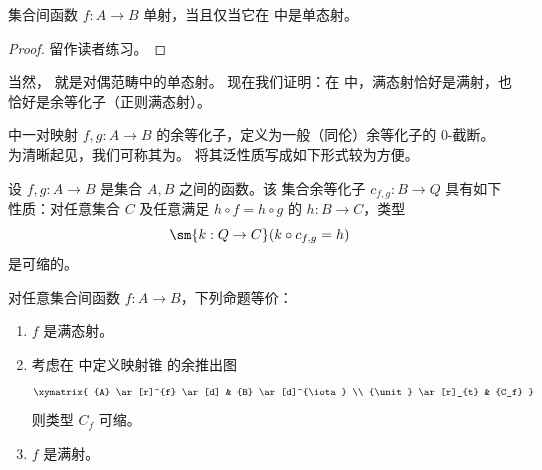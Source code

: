\begin{lem}\label{thm:inj-mono}
  集合间函数 $f:A\to B$ 单射，当且仅当它在 \uset 中是单态射。
\end{lem}
\begin{proof}
  留作读者练习。
\end{proof}

当然，
%
%
就是对偶范畴中的单态射。
现在我们证明：在 \uset 中，满态射恰好是满射，也恰好是余等化子（正则满态射）。

\uset 中一对映射 $f,g:A\to B$ 的余等化子，定义为一般（同伦）余等化子的 0-截断。
为清晰起见，我们可称其为。
%
%
将其泛性质写成如下形式较为方便。

\begin{lem}
%
设 $f,g:A\to B$ 是集合 $A,B$ 之间的函数。该
集合余等化子 $c_{f,g}:B\to Q$ 具有如下性质：对任意集合 $C$ 及任意满足 $h\circ f = h\circ g$ 的 $h:B\to C$，类型
\begin{equation*}
\sm{k:Q\to C} (k\circ c_{f,g} = h)
\end{equation*}
是可缩的。
\end{lem}

\begin{lem}\label{epis-surj}
对任意集合间函数 $f:A\to B$，下列命题等价：
\begin{enumerate}
\item $f$ 是满态射。
\item 考虑在 \uset 中定义映射锥 的余推出图
\begin{equation*}
  \xymatrix{
    {A}
    \ar[r]^{f}
    \ar[d]
    &
    {B}
    \ar[d]^{\iota}
    \\
    {\unit}
    \ar[r]_{t}
    &
    {C_f}
  }
\end{equation*}
则类型 $C_f$ 可缩。
\item $f$ 是满射。
\end{enumerate}
\end{lem}

